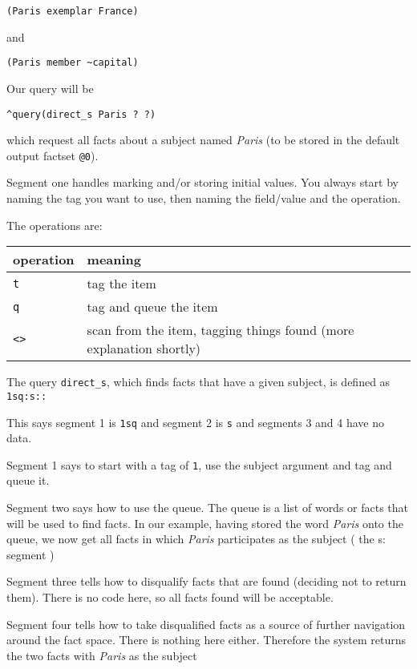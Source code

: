 \documentclass[]{article}
\begin{document}
\begin{verbatim}
(Paris exemplar France)
\end{verbatim}

and

\begin{verbatim}
(Paris member ~capital)
\end{verbatim}

Our query will be

\begin{verbatim}
^query(direct_s Paris ? ?)
\end{verbatim}

which request all facts about a subject named \emph{Paris} (to be stored
in the default output factset \texttt{@0}).

Segment one handles marking and/or storing initial values. You always
start by naming the tag you want to use, then naming the field/value and
the operation.

The operations are:

\begin{longtable}[]{@{}ll@{}}
\toprule
operation & meaning\tabularnewline
\midrule
\endhead
\texttt{t} & tag the item\tabularnewline
\texttt{q} & tag and queue the item\tabularnewline
\texttt{\textless{}}\texttt{\textgreater{}} & scan from the item,
tagging things found (more explanation shortly)\tabularnewline
\bottomrule
\end{longtable}

The query \texttt{direct\_s}, which finds facts that have a given
subject, is defined as \texttt{1sq:s::}

This says segment 1 is \texttt{1sq} and segment 2 is \texttt{s} and
segments 3 and 4 have no data.

Segment 1 says to start with a tag of \texttt{1}, use the subject
argument and tag and queue it.

Segment two says how to use the queue. The queue is a list of words or
facts that will be used to find facts. In our example, having stored the
word \emph{Paris} onto the queue, we now get all facts in which
\emph{Paris} participates as the subject ( the s: segment )

Segment three tells how to disqualify facts that are found (deciding not
to return them). There is no code here, so all facts found will be
acceptable.

Segment four tells how to take disqualified facts as a source of further
navigation around the fact space. There is nothing here either.
Therefore the system returns the two facts with \emph{Paris} as the
subject
\end{document}
